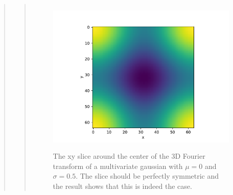 \begin{quote}
\begin{quote}
\begin{figure}[!hb]
\centering
\includegraphics[width=14cm, height=7.5cm]{./Plots/5e_gaussian_xy.pdf}
\caption{The xy slice around the center of the 3D Fourier transform of a multivariate gaussian with $\mu = 0$ and $\sigma = 0.5$.  The slice should be perfectly symmetric and the result shows that this is indeed the case. }
\end{figure}
\end{quote}

\end{quote}














